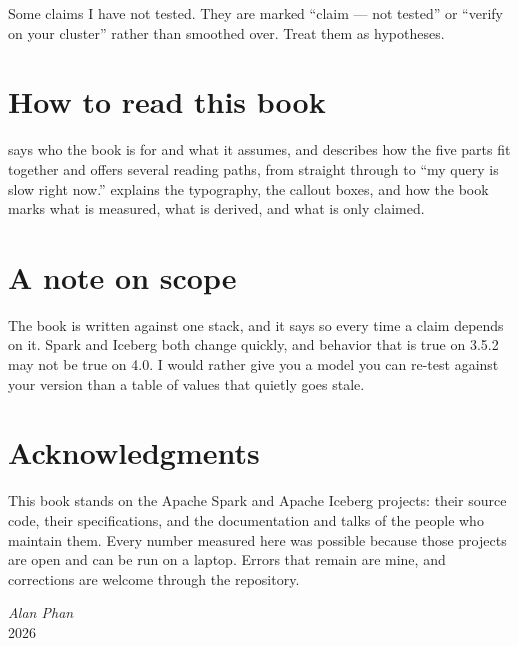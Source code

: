 Some claims I have not tested. They are marked ``claim --- not tested'' or
``verify on your cluster'' rather than smoothed over. Treat them as hypotheses.

\section*{How to read this book}

 says who the book is for and what it assumes, and
 describes how the five parts fit together and offers several
reading paths, from straight through to ``my query is slow right now.''
 explains the typography, the callout boxes, and how the book
marks what is measured, what is derived, and what is only claimed.

\section*{A note on scope}

The book is written against one stack, and it says so every time a claim depends
on it. Spark and Iceberg both change quickly, and behavior that is true on 3.5.2
may not be true on 4.0. I would rather give you a model you can re-test against
your version than a table of values that quietly goes stale.

\section*{Acknowledgments}

This book stands on the Apache Spark and Apache Iceberg projects: their source
code, their specifications, and the documentation and talks of the people who
maintain them. Every number measured here was possible because those projects are
open and can be run on a laptop. Errors that remain are mine, and corrections are
welcome through the repository.

\bigskip
\begin{flushright}
\textit{Alan Phan}\\
2026
\end{flushright}
